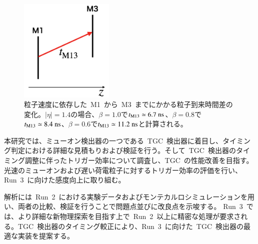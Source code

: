 \begin{figure}[H]
        \centering   
        \includegraphics[width=0.4\textwidth,page=4]{img/pdf3/time.png}
        \caption[粒子速度に依存した~M1~から~M3~までにかかる粒子到来時間差の変化]{粒子速度に依存した~M1~から~M3~までにかかる粒子到来時間差の変化。$|\eta|=1.4$の場合、$\beta=1.0$で$t_{\rm M13}\simeq6.7~\rm ns$、$\beta=0.8$で$t_{\rm M13}\simeq8.4~\rm ns$、$\beta=0.6$で$t_{\rm M13}\simeq11.2~\rm ns$と計算される。}
        \label{fig:time}
\end{figure}

\newpage
本研究では、ミューオン検出器の一つである~TGC~検出器に着目し、タイミング判定における詳細な見積もりおよび検証を行う。そして~TGC~検出器のタイミング調整に伴ったトリガー効率について調査し、TGC~の性能改善を目指す。光速のミューオンおよび遅い荷電粒子に対するトリガー効率の評価を行い、Run~3~に向けた感度向上に取り組む。

解析には~Run~2~における実験データおよびモンテカルロシミュレーションを用い、両者の比較、検証を行うことで問題点並びに改良点を示唆する。
Run~3~では、より詳細な新物理探索を目指す上で~Run~2~以上に精密な処理が要求される。TGC~検出器のタイミング較正により、Run~3~に向けた~TGC~検出器の最適な実装を提案する。
